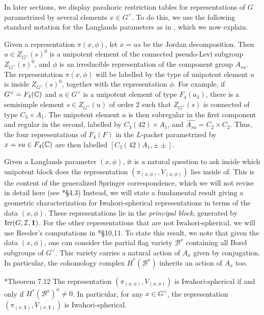 In later sections, we display parahoric restriction tables for representations of $G$ parametrized by several elements $x\in G^\vee$. To do this, we use the following standard notation for the Langlands parameters as in \cite{Reeder2000}, which we now explain. 
\begin{notation}\label{notation:Langlandsparam}
    Given a representation $\pi(x,\phi)$, let $x=us$ be the Jordan decomposition. Then $u\in Z_{G^\vee}(s)^0$ is a unipotent element of the connected pseudo-Levi subgroup $Z_{G^\vee}(s)^0$, and $\phi$ is an irreducible representation of the component group $A_{su}$. The representation $\pi(x,\phi)$ will be labelled by the type of unipotent element $u$ is inside $Z_{G^\vee}(s)^0$, together with the representation $\phi$. For example, if $G^\vee=F_4(\mathbb{C})$ and $u\in G^\vee$ is a unipotent element of type $F_4(a_3)$, there is a semisimple element $s\in Z_{G^\vee}(u)$ of order $2$ such that $Z_{G^\vee}(s)$ is connected of type $C_3\times A_1$. The unipotent element $u$ is then subregular in the first component and regular in the second, labelled by $C_3(42)\times A_1$, and $\widehat{A_{su}}=C_2\times C_2$. Thus, the four representations of $F_4(F)$ in the $L$-packet parametrized by $x=su\in F_4(\mathbb{C})$ are then labelled $[C_3(42)A_1,\pm\pm]$. %
\end{notation}

Given a Langlands parameter $(x,\phi)$, it is a natural question to ask inside which unipotent block does the representation $(\pi_{(x,\phi)},V_{(x,\phi)})$ lies inside of. This is the content of the generalized Springer correspondence, which we will not revise in detail here (see \cite{CiubotaruMasonBrownOkada2025}*{\S4.3}) Instead, we will state a fundamental result giving a geometric characterization for Iwahori-spherical representations in terms of the data $(x,\phi)$. These representations lie in the \textit{principal block}, generated by $\mathrm{Irr}(G,\mathcal{I},\mathbf{1})$. For the other representations that are not Iwahori-spherical, we will use Reeder's computations in \cite{Reeder2000}*{\S 10,11}. To state this result, we note that given the data $(x,\phi)$, one can consider the partial flag variety $\mathcal{B}^x$ containing all Borel subgroups of $G^\vee$. This variety carries a natural action of $A_x$ given by conjugation. In particular, the cohomology complex $H^*(\mathcal{B}^x)$ inherits an action of $A_x$ too.
\begin{theorem}\cite{KazhdanLusztig1987}*{Theorem 7.12}
    The representation $(\pi_{(x,\phi)},V_{(x,\phi)})$ is Iwahori-spherical if and only if $H^*(\mathcal{B}^x)^\phi\neq 0$. In particular, for any $x\in G^\vee$, the representation $(\pi_{(x,\mathbf{1})},V_{(x,\mathbf{1})})$ is Iwahori-spherical.
\end{theorem}

